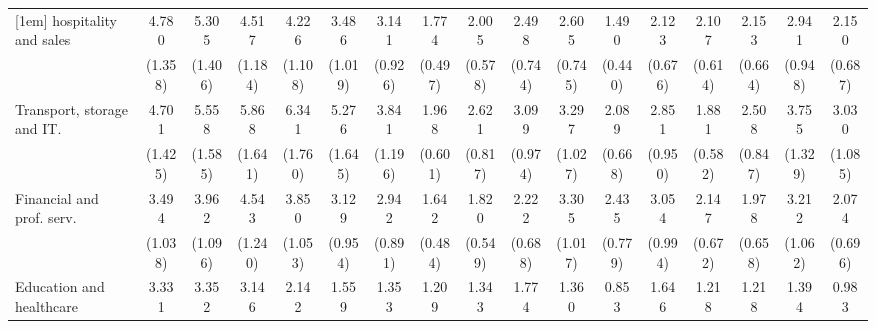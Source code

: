 {\begin{tabular}{l*{16}{c}}
[1em]
hospitality and sales&       4.780\sym{***}&       5.305\sym{***}&       4.517\sym{***}&       4.226\sym{***}&       3.486\sym{***}&       3.141\sym{***}&       1.774\sym{*}  &       2.005\sym{*}  &       2.498\sym{**} &       2.605\sym{***}&       1.490         &       2.123\sym{*}  &       2.107\sym{*}  &       2.153\sym{*}  &       2.941\sym{***}&       2.150\sym{*}  \\
                    &     (1.358)         &     (1.406)         &     (1.184)         &     (1.108)         &     (1.019)         &     (0.926)         &     (0.497)         &     (0.578)         &     (0.744)         &     (0.745)         &     (0.440)         &     (0.676)         &     (0.614)         &     (0.664)         &     (0.948)         &     (0.687)         \\
[1em]
Transport, storage and IT.&       4.701\sym{***}&       5.558\sym{***}&       5.868\sym{***}&       6.341\sym{***}&       5.276\sym{***}&       3.841\sym{***}&       1.968\sym{*}  &       2.621\sym{**} &       3.099\sym{***}&       3.297\sym{***}&       2.089\sym{*}  &       2.851\sym{**} &       1.881\sym{*}  &       2.508\sym{**} &       3.755\sym{***}&       3.030\sym{**} \\
                    &     (1.425)         &     (1.585)         &     (1.641)         &     (1.760)         &     (1.645)         &     (1.196)         &     (0.601)         &     (0.817)         &     (0.974)         &     (1.027)         &     (0.668)         &     (0.950)         &     (0.582)         &     (0.847)         &     (1.329)         &     (1.085)         \\
[1em]
Financial and prof. serv.&       3.494\sym{***}&       3.962\sym{***}&       4.543\sym{***}&       3.850\sym{***}&       3.129\sym{***}&       2.942\sym{***}&       1.642         &       1.820\sym{*}  &       2.222\sym{**} &       3.305\sym{***}&       2.435\sym{**} &       3.054\sym{***}&       2.147\sym{*}  &       1.978\sym{*}  &       3.212\sym{***}&       2.074\sym{*}  \\
                    &     (1.038)         &     (1.096)         &     (1.240)         &     (1.053)         &     (0.954)         &     (0.891)         &     (0.484)         &     (0.549)         &     (0.688)         &     (1.017)         &     (0.779)         &     (0.994)         &     (0.672)         &     (0.658)         &     (1.062)         &     (0.696)         \\
[1em]
Education and healthcare&       3.331\sym{***}&       3.352\sym{***}&       3.146\sym{***}&       2.142\sym{*}  &       1.559         &       1.353         &       1.209         &       1.343         &       1.774         &       1.360         &       0.853         &       1.646         &       1.218         &       1.218         &       1.394         &       0.983         \\

\end{tabular}}

